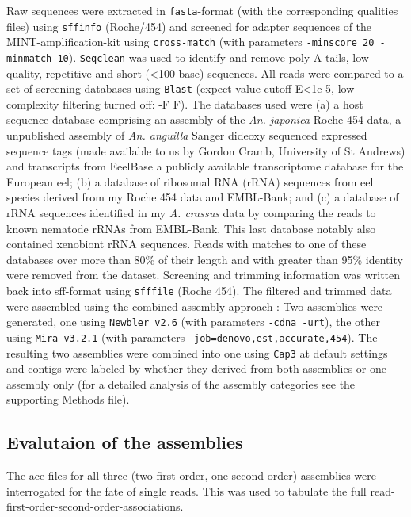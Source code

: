 Raw sequences were extracted in \texttt{fasta}-format (with the
corresponding qualities files) using \texttt{sffinfo} (Roche/454) and
screened for adapter sequences of the MINT-amplification-kit using
\texttt{cross-match} \cite{PHRAP} (with parameters \texttt{-minscore
  20 -minmatch 10}). \texttt{Seqclean} \cite{tgicl_pertea} was used to
identify and remove poly-A-tails, low quality, repetitive and short
(<100 base) sequences. All reads were compared to a set of screening
databases using \texttt{Blast} (expect value cutoff E<1e-5, low
complexity filtering turned off: -F F). The databases used were (a) a
host sequence database comprising an assembly of the
\textit{An. japonica} Roche 454 data, a unpublished assembly of
\textit{An. anguilla} Sanger dideoxy sequenced expressed sequence tags
(made available to us by Gordon Cramb, University of St Andrews) and
transcripts from EeelBase \cite{pmid21080939} a publicly available
transcriptome database for the European eel; (b) a database of
ribosomal RNA (rRNA) sequences from eel species derived from my Roche
454 data and EMBL-Bank; and (c) a database of rRNA sequences
identified in my \textit{A. crassus} data by comparing the reads to
known nematode rRNAs from EMBL-Bank. This last database notably also
contained xenobiont rRNA sequences. Reads with matches to one of these
databases over more than 80\% of their length and with greater than
95\% identity were removed from the dataset. Screening and trimming
information was written back into sff-format using \texttt{sfffile}
(Roche 454). The filtered and trimmed data were assembled using the
combined assembly approach \cite{pmid20950480}: Two assemblies were
generated, one using \texttt{Newbler v2.6} \cite{pmid16056220} (with
parameters \texttt{-cdna -urt}), the other using \texttt{Mira v3.2.1}
\cite{miraEST} (with parameters
\texttt{--job=denovo,est,accurate,454}). The resulting two assemblies
were combined into one using \texttt{Cap3} \cite{Cap3_Huang} at
default settings and contigs were labeled by whether they derived from
both assemblies or one assembly only (for a detailed analysis of the
assembly categories see the supporting Methods file).

\subsection{Evalutaion of the assemblies}

The ace-files for all three (two first-order, one second-order)
assemblies were interrogated for the fate of single reads. This was
used to tabulate the full read-first-order-second-order-associations.

